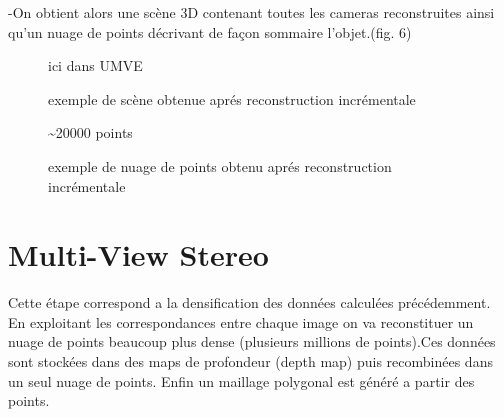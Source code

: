 \documentclass[a4paper,10pt,french]{sphinxhowto}
\begin{document}
-On obtient alors une scène 3D contenant toutes les cameras reconstruites ainsi qu'un nuage de points décrivant de façon sommaire l'objet.(fig. 6)
\begin{figure}[htbp]
\centering
\capstart

\caption{exemple de scène obtenue aprés reconstruction incrémentale}{\small 
ici dans UMVE
}\end{figure}
\begin{figure}[htbp]
\centering
\capstart

\caption{exemple de nuage de points obtenu aprés reconstruction incrémentale}{\small 
\textasciitilde{}20000 points
}\end{figure}


\section{Multi-View Stereo}
\label{mvs:multi-view-stereo}\label{mvs::doc}
Cette étape correspond a la densification des données calculées précédemment. En exploitant les correspondances entre chaque image on va reconstituer un nuage de points beaucoup plus dense (plusieurs millions de points).Ces données sont stockées dans des maps de profondeur (depth map) puis recombinées dans un seul nuage de points. Enfin un maillage polygonal est généré a partir des points.
\end{document}
